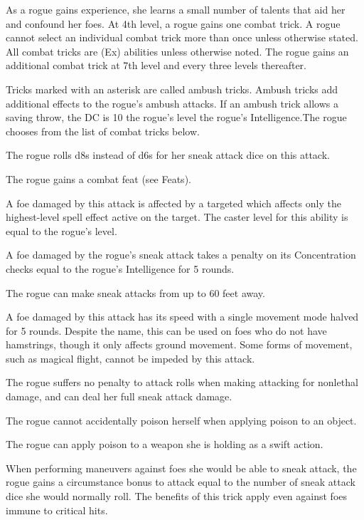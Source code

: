  As a rogue gains experience, she learns a small number of talents that aid her and confound her foes. At 4th level, a rogue gains one combat trick. A rogue cannot select an individual combat trick more than once unless otherwise stated. All combat tricks are (Ex) abilities unless otherwise noted. The rogue gains an additional combat trick at 7th level and every three levels thereafter.

\par Tricks marked with an asterisk are called ambush tricks. Ambush tricks add additional effects to the rogue's ambush attacks. If an ambush trick allows a saving throw, the DC is 10 \add the rogue's level \add the rogue's Intelligence.The rogue chooses from the list of combat tricks below.

 The rogue rolls d8s instead of d6s for her sneak attack dice on this attack.

 The rogue gains a combat feat (see Feats).

 A foe damaged by this attack is affected by a targeted  which affects only the highest-level spell effect active on the target. The caster level for this ability is equal to the rogue's level.

 A foe damaged by the rogue's sneak attack takes a penalty on its Concentration checks equal to the rogue's Intelligence for 5 rounds.

 The rogue can make sneak attacks from up to 60 feet away.

 A foe damaged by this attack has its speed with a single movement mode halved for 5 rounds. Despite the name, this can be used on foes who do not have hamstrings, though it only affects ground movement. Some forms of movement, such as magical flight, cannot be impeded by this attack.

 The rogue suffers no penalty to attack rolls when making attacking for nonlethal damage, and can deal her full sneak attack damage.

 The rogue cannot accidentally poison herself when applying poison to an object.

 The rogue can apply poison to a weapon she is holding as a swift action.

 When performing maneuvers against foes she would be able to sneak attack, the rogue gains a circumstance bonus to attack equal to the number of sneak attack dice she would normally roll. The benefits of this trick apply even against foes immune to critical hits.

